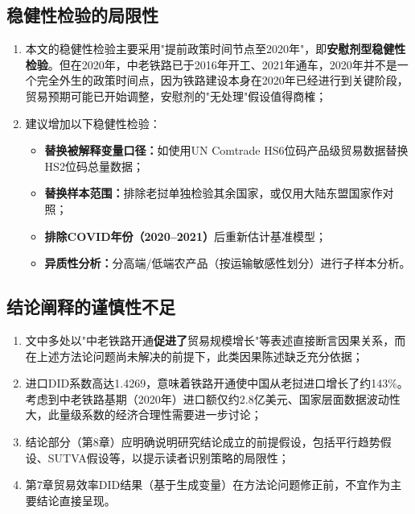 \documentclass[12pt, a4paper]{article}
\begin{document}
\subsection{稳健性检验的局限性}
\label{sec:robustness}

\begin{minorbox}

\begin{enumerate}[label=\arabic*)]
  \item 本文的稳健性检验主要采用"提前政策时间节点至2020年"，即\textbf{安慰剂型稳健性检验}。但在2020年，中老铁路已于2016年开工、2021年通车，2020年并不是一个完全外生的政策时间点，因为铁路建设本身在2020年已经进行到关键阶段，贸易预期可能已开始调整，安慰剂的"无处理"假设值得商榷；

  \item 建议增加以下稳健性检验：
    \begin{itemize}
      \item \textbf{替换被解释变量口径：}如使用UN Comtrade HS6位码产品级贸易数据替换HS2位码总量数据；
      \item \textbf{替换样本范围：}排除老挝单独检验其余国家，或仅用大陆东盟国家作对照；
      \item \textbf{排除COVID年份（2020--2021）}后重新估计基准模型；
      \item \textbf{异质性分析：}分高端/低端农产品（按运输敏感性划分）进行子样本分析。
    \end{itemize}
\end{enumerate}
\end{minorbox}

\subsection{结论阐释的谨慎性不足}
\label{sec:conclusion}

\begin{minorbox}

\begin{enumerate}[label=\arabic*)]
  \item 文中多处以"中老铁路开通\textbf{促进了}贸易规模增长"等表述直接断言因果关系，而在上述方法论问题尚未解决的前提下，此类因果陈述缺乏充分依据；

  \item 进口DID系数高达1.4269，意味着铁路开通使中国从老挝进口增长了约143\%。考虑到中老铁路基期（2020年）进口额仅约2.8亿美元、国家层面数据波动性大，此量级系数的经济合理性需要进一步讨论；

  \item 结论部分（第8章）应明确说明研究结论成立的前提假设，包括平行趋势假设、SUTVA假设等，以提示读者识别策略的局限性；

  \item 第7章贸易效率DID结果（基于生成变量）在方法论问题修正前，不宜作为主要结论直接呈现。
\end{enumerate}
\end{minorbox}
\end{document}
